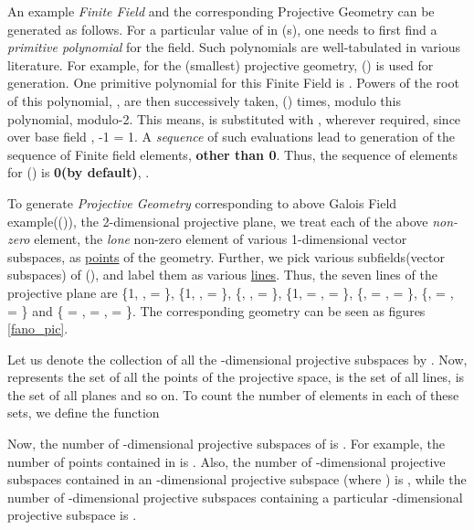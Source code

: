 \documentclass[12pt]{article}
\begin{document}
An example \textit{Finite Field} and the corresponding Projective Geometry
can be generated as follows. For a particular value of {\large
} in {\large }(s), one needs to first find a
\textit{primitive polynomial} for the field. Such polynomials are
well-tabulated in various literature. For example, for the (smallest)
projective geometry, {\large }({\large }) is used for
generation. One primitive polynomial for this Finite Field is {\large
}. Powers of the root of this polynomial, {\large
}, are then successively taken, ({\large }) times,
modulo this polynomial, modulo-{\large 2}.  This means, {\large
} is substituted with {\large }, wherever
required, since over base field {\large , -1 = 1}. A
\textit{sequence} of such evaluations lead to generation of the sequence of
{\large } Finite field elements, \textbf{other than 0}.
Thus, the sequence of {\large } elements for {\large
}({\large }) is \textbf{0(by default)}, {\large }.

\begin{figure*}[h]
\centerline{
\hfil
{}}
\caption{2-dimensional Projective Geometry}
\label{fano_pic}
\end{figure*}

To generate \textit{Projective Geometry} corresponding to above Galois
Field example({\large }({\large })), the
2-dimensional projective
plane, we treat each of the above \textit{non-zero} element, the
\textit{lone} non-zero element of various 1-dimensional vector subspaces, as
\uline{points} of the geometry. Further, we pick various subfields(vector
subspaces) of {\large }({\large }), and label them as
various \uline{lines}. Thus, the seven lines of the projective plane are
\{{\large 1, }, {\large } = {\large }\},
\{{\large 1, }, {\large } = {\large }\},
\{{\large }, {\large }, {\large } = {\large
}\}, \{{\large 1,} = {\large },
{\large } = {\large }\}, \{{\large },
{\large } = {\large }, {\large } =
{\large }\}, \{{\large }, {\large } =
{\large }, {\large } = {\large }\}
and \{{\large } = {\large }, {\large } =
{\large }, {\large } = {\large }\}.
The corresponding geometry can be seen as figures \ref{fano_pic}.

Let us denote the collection of all the {\large }-dimensional
projective subspaces by {\large }. Now, {\large
} represents the set of all the points of the
projective space, {\large } is the set of all lines,
{\large } is the set of all planes and so on. To count
the number of elements in each of these sets, we define the function

{\large

}

Now, the number of {\large }-dimensional projective subspaces of {\large
} is {\large }. For example, the
number of points contained in {\large } is {\large
}. Also, the number of {\large }-dimensional projective 
subspaces contained in an {\large }-dimensional projective subspace (where
{\large }) is {\large }, while the number
of {\large }-dimensional projective subspaces containing a particular
{\large }-dimensional projective subspace is {\large
}.
 
\end{document}
